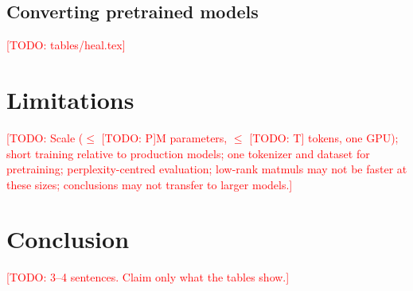 \documentclass{article}
\newcommand{\todo}[1]{\textcolor{red}{[TODO: #1]}}
\begin{document}
\begin{table}[t]
  \centering
  \caption{Size S, \trainTokensM{}M tokens: final validation loss (mean $\pm$ std over seeds), MLP
  parameters per layer and logged throughput (not a speed measurement, see text).}
  \label{tab:training}
  \small
  
\end{table}

\begin{table}[t]
  \centering
  \caption{Seed-paired differences in final validation loss (first arm minus second, same seed). Positive
  means the first arm is worse. The thin gate is behind its parameter-matched dense twin in every pair at
  every rank.}
  \label{tab:paired}
  \small
  
\end{table}

\subsection{Converting pretrained models}
\todo{tables/heal.tex}

\section{Limitations}
\todo{Scale ($\le$ \todo{P}M parameters, $\le$ \todo{T} tokens, one GPU); short training relative to
production models; one tokenizer and dataset for pretraining; perplexity-centred evaluation; low-rank
matmuls may not be faster at these sizes; conclusions may not transfer to larger models.}

\section{Conclusion}
\todo{3--4 sentences. Claim only what the tables show.}

\end{document}
